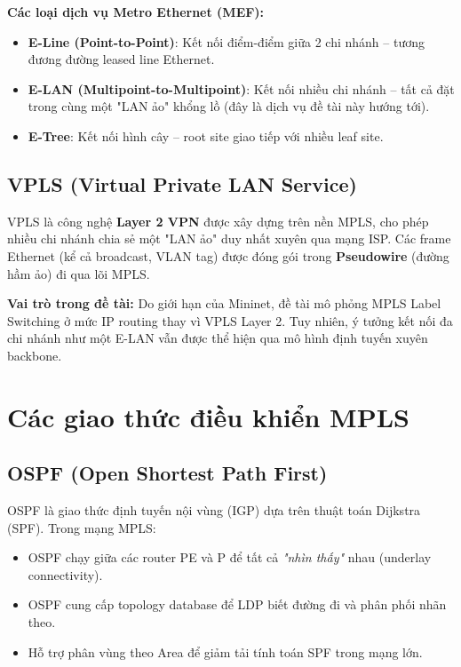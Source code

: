 \textbf{Các loại dịch vụ Metro Ethernet (MEF):}
\begin{itemize}
    \item \textbf{E-Line (Point-to-Point)}: Kết nối điểm-điểm giữa 2 chi nhánh – tương đương đường leased line Ethernet.
    \item \textbf{E-LAN (Multipoint-to-Multipoint)}: Kết nối nhiều chi nhánh – tất cả đặt trong cùng một "LAN ảo" khổng lồ (đây là dịch vụ đề tài này hướng tới).
    \item \textbf{E-Tree}: Kết nối hình cây – root site giao tiếp với nhiều leaf site.
\end{itemize}

\subsection{VPLS (Virtual Private LAN Service)}

VPLS là công nghệ \textbf{Layer 2 VPN} được xây dựng trên nền MPLS, cho phép nhiều chi nhánh chia sẻ một "LAN ảo" duy nhất xuyên qua mạng ISP. Các frame Ethernet (kể cả broadcast, VLAN tag) được đóng gói trong \textbf{Pseudowire} (đường hầm ảo) đi qua lõi MPLS.

\textbf{Vai trò trong đề tài:} Do giới hạn của Mininet, đề tài mô phỏng MPLS Label Switching ở mức IP routing thay vì VPLS Layer 2. Tuy nhiên, ý tưởng kết nối đa chi nhánh như một E-LAN vẫn được thể hiện qua mô hình định tuyến xuyên backbone.

\section{Các giao thức điều khiển MPLS}

\subsection{OSPF (Open Shortest Path First)}

OSPF là giao thức định tuyến nội vùng (IGP) dựa trên thuật toán Dijkstra (SPF). Trong mạng MPLS:
\begin{itemize}
    \item OSPF chạy giữa các router PE và P để tất cả \textit{"nhìn thấy"} nhau (underlay connectivity).
    \item OSPF cung cấp topology database để LDP biết đường đi và phân phối nhãn theo.
    \item Hỗ trợ phân vùng theo Area để giảm tải tính toán SPF trong mạng lớn.
\end{itemize}

